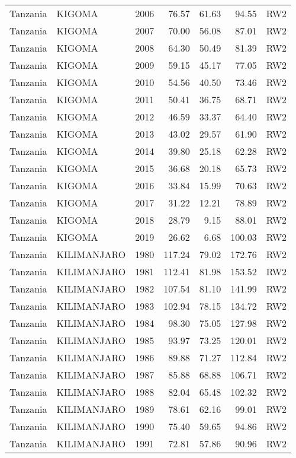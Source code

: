 \begin{longtable}{lllrrrl}
  Tanzania & KIGOMA & 2006 & 76.57 & 61.63 & 94.55 & RW2 \\ 
  Tanzania & KIGOMA & 2007 & 70.00 & 56.08 & 87.01 & RW2 \\ 
  Tanzania & KIGOMA & 2008 & 64.30 & 50.49 & 81.39 & RW2 \\ 
  Tanzania & KIGOMA & 2009 & 59.15 & 45.17 & 77.05 & RW2 \\ 
  Tanzania & KIGOMA & 2010 & 54.56 & 40.50 & 73.46 & RW2 \\ 
  Tanzania & KIGOMA & 2011 & 50.41 & 36.75 & 68.71 & RW2 \\ 
  Tanzania & KIGOMA & 2012 & 46.59 & 33.37 & 64.40 & RW2 \\ 
  Tanzania & KIGOMA & 2013 & 43.02 & 29.57 & 61.90 & RW2 \\ 
  Tanzania & KIGOMA & 2014 & 39.80 & 25.18 & 62.28 & RW2 \\ 
  Tanzania & KIGOMA & 2015 & 36.68 & 20.18 & 65.73 & RW2 \\ 
  Tanzania & KIGOMA & 2016 & 33.84 & 15.99 & 70.63 & RW2 \\ 
  Tanzania & KIGOMA & 2017 & 31.22 & 12.21 & 78.89 & RW2 \\ 
  Tanzania & KIGOMA & 2018 & 28.79 & 9.15 & 88.01 & RW2 \\ 
  Tanzania & KIGOMA & 2019 & 26.62 & 6.68 & 100.03 & RW2 \\ 
  Tanzania & KILIMANJARO & 1980 & 117.24 & 79.02 & 172.76 & RW2 \\ 
  Tanzania & KILIMANJARO & 1981 & 112.41 & 81.98 & 153.52 & RW2 \\ 
  Tanzania & KILIMANJARO & 1982 & 107.54 & 81.10 & 141.99 & RW2 \\ 
  Tanzania & KILIMANJARO & 1983 & 102.94 & 78.15 & 134.72 & RW2 \\ 
  Tanzania & KILIMANJARO & 1984 & 98.30 & 75.05 & 127.98 & RW2 \\ 
  Tanzania & KILIMANJARO & 1985 & 93.97 & 73.25 & 120.01 & RW2 \\ 
  Tanzania & KILIMANJARO & 1986 & 89.88 & 71.27 & 112.84 & RW2 \\ 
  Tanzania & KILIMANJARO & 1987 & 85.88 & 68.88 & 106.71 & RW2 \\ 
  Tanzania & KILIMANJARO & 1988 & 82.04 & 65.48 & 102.32 & RW2 \\ 
  Tanzania & KILIMANJARO & 1989 & 78.61 & 62.16 & 99.01 & RW2 \\ 
  Tanzania & KILIMANJARO & 1990 & 75.40 & 59.65 & 94.86 & RW2 \\ 
  Tanzania & KILIMANJARO & 1991 & 72.81 & 57.86 & 90.96 & RW2 \\ 

\end{longtable}
